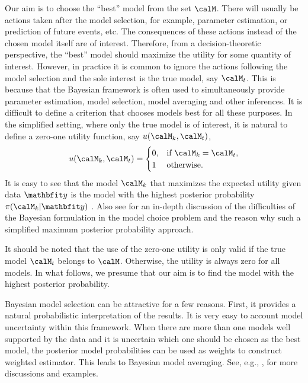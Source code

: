 Our aim is to choose the ``best'' model from the set $\calM$. There will usually be actions taken after the model selection, for example, parameter estimation, or prediction of future events, etc. The consequences of these actions instead of the chosen model itself are of interest. Therefore, from a decision-theoretic perspective, the ``best'' model should maximize the utility for some quantity of interest. However, in practice it is common to ignore the actions following the model selection and the sole interest is the true model, say $\calM_t$. This is because that the Bayesian framework is often used to simultaneously provide parameter estimation, model selection, model averaging and other inferences. It is difficult to define a criterion that chooses models best for all these purposes. In the simplified setting, where only the true model is of interest, it is natural to define a zero-one utility function, say $u(\calM_k,\calM_t)$,
\begin{equation}
  u(\calM_k,\calM_t) =
  \begin{cases}
    0, &\text{if } \calM_k = \calM_t,\\
    1  &\text{otherwise.}
  \end{cases}
\end{equation}
It is easy to see that the model $\calM_k$ that maximizes the expected utility given data $\data$ is the model with the highest posterior probability $\pi(\calM_k|\data)$ \cite[][chap.~6]{Bernardo:1994vd}. Also see \cite[][sec.~7.2.1]{Robert:2007tc} for an in-depth discussion of the difficulties of the Bayesian formulation in the model choice problem and the reason why such a simplified maximum posterior probability approach.

It should be noted that the use of the zero-one utility is only valid if the true model $\calM_t$ belongs to $\calM$. Otherwise, the utility is always zero for all models. In what follows, we presume that our aim is to find the model with the highest posterior probability.

Bayesian model selection can be attractive for a few reasons. First, it provides a natural probabilistic interpretation of the results. It is very easy to account model uncertainty within this framework. When there are more than one models well supported by the data and it is uncertain which one should be chosen as the best model, the posterior model probabilities can be used as weights to construct weighted estimator. This leads to Bayesian model averaging. See, e.g., \cite{Raftery:1997vx,Clyde:1999vx,Draper:1995vx}, for more discussions and examples.

